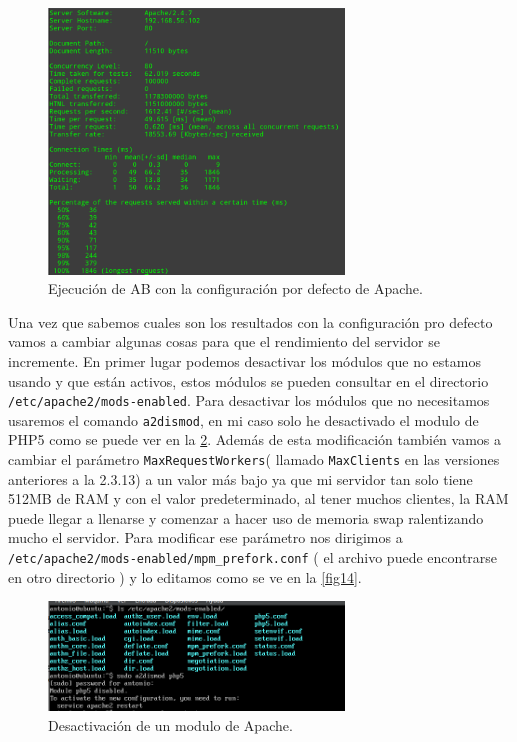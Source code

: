 \begin{figure}[H]
  \begin{center}
    \includegraphics[width=0.7\textwidth]{imagenes/12}
    \caption{Ejecución de AB con la configuración por defecto de Apache.}
    \label{fig12}
  \end{center}
\end{figure}

Una vez que sabemos cuales son los resultados con la configuración pro defecto vamos a cambiar algunas cosas para que el rendimiento del servidor se incremente. En primer lugar podemos desactivar los módulos que no estamos usando y que están activos, estos módulos se pueden consultar en el directorio \texttt{/etc/apache2/mods-enabled}. Para desactivar los módulos que no necesitamos usaremos el comando \texttt{a2dismod}, en mi caso solo he desactivado el modulo de PHP5 como se puede ver en la \cref{fig13}. Además de esta modificación también vamos a cambiar el parámetro \texttt{MaxRequestWorkers}( llamado \texttt{MaxClients} en las versiones anteriores a la 2.3.13) a un valor más bajo ya que mi servidor tan solo tiene 512MB de RAM y con el valor predeterminado, al tener muchos clientes, la RAM puede llegar a llenarse y comenzar a hacer uso de memoria swap ralentizando mucho el servidor. Para modificar ese parámetro nos dirigimos a\texttt{ /etc/apache2/mods-enabled/mpm\_prefork.conf} ( el archivo puede encontrarse en otro directorio ) y lo editamos como se ve en la \cref{fig14}. \cite{per1}\cite{per2}

\begin{figure}[H]
  \begin{center}
    \includegraphics[width=0.7\textwidth]{imagenes/13}
    \caption{Desactivación de un modulo de Apache.}
    \label{fig13}
  \end{center}
\end{figure}


